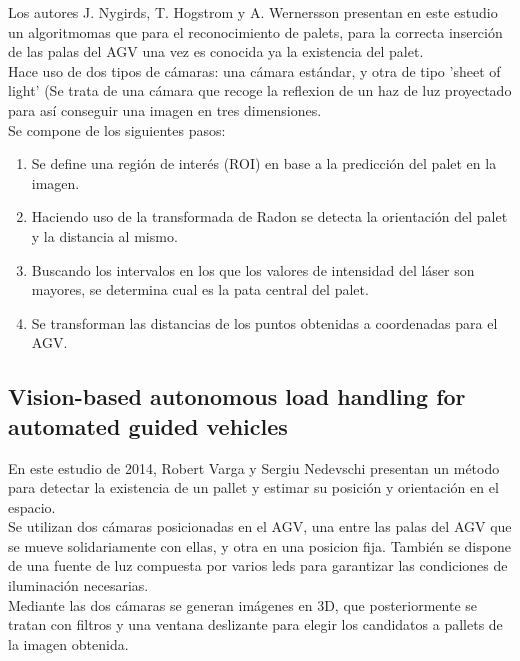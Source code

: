 Los autores J. Nygirds, T. Hogstrom y A. Wernersson presentan en este estudio un algoritmomas que para el reconocimiento de palets, para la correcta inserción de las palas del AGV una vez es conocida ya la existencia del palet. \\ Hace uso de dos tipos de cámaras: una cámara estándar, y otra de tipo 'sheet of light' (Se trata de una cámara que recoge la reflexion de un haz de luz proyectado para así conseguir una imagen en tres dimensiones.\\
Se compone de los siguientes pasos:
\begin{enumerate}

\item Se define una región de interés (ROI) en base a la predicción del palet en la imagen.
\item Haciendo uso de la transformada de Radon se detecta la orientación del palet y la distancia al mismo.
\item Buscando los intervalos en los que los valores de intensidad del láser son mayores, se determina cual es la pata central del palet.
\item Se transforman las distancias de los puntos obtenidas a coordenadas para el AGV.
\end{enumerate}


\subsection{Vision-based autonomous load handling for automated guided vehicles \cite{art15:6937003}}
En este estudio de 2014, Robert Varga y Sergiu Nedevschi presentan un método para detectar la existencia de un pallet y estimar su posición y orientación en el espacio.\\
Se utilizan dos cámaras posicionadas en el AGV, una entre las palas del AGV que se mueve solidariamente con ellas, y otra en una posicion fija.
También se dispone de una fuente de luz compuesta por varios leds para garantizar las condiciones de iluminación necesarias.\\
Mediante las dos cámaras se generan imágenes en 3D, que posteriormente se tratan con filtros y una ventana deslizante para elegir los candidatos a pallets de la imagen obtenida.


